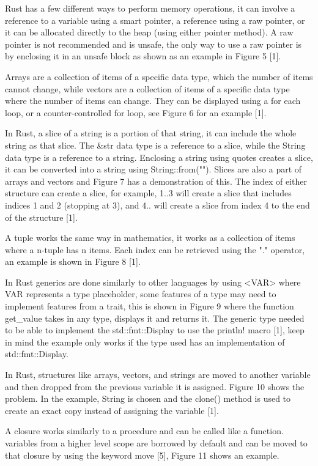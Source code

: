 \documentclass[sigconf,authorversion,nonacm]{acmart}
\begin{document}
Rust has a few different ways to perform memory operations, it can involve a reference to a variable using a smart pointer, a reference using a raw pointer, or it can be allocated directly to the heap (using either pointer method). A raw pointer is not recommended and is unsafe, the only way to use a raw pointer is by enclosing it in an unsafe block as shown as an example in Figure 5 [1].

Arrays are a collection of items of a specific data type, which the number of items cannot change, while vectors are a collection of items of a specific data type where the number of items can change. They can be displayed using a for each loop, or a counter-controlled for loop, see Figure 6 for an example [1].

In Rust, a slice of a string is a portion of that string, it can include the whole string as that slice. The \&str data type is a reference to a slice, while the String data type is a reference to a string. Enclosing a string using quotes creates a slice, it can be converted into a string using String::from(""). Slices are also a part of arrays and vectors and Figure 7 has a demonstration of this. The index of either structure can create a slice, for example, 1..3 will create a slice that includes indices 1 and 2 (stopping at 3), and 4.. will create a slice from index 4 to the end of the structure [1].

A tuple works the same way in mathematics, it works as a collection of items where a n-tuple has n items. Each index can be retrieved using the "." operator, an example is shown in Figure 8 [1].

In Rust generics are done similarly to other languages by using <VAR> where VAR represents a type placeholder, some features of a type may need to implement features from a trait, this is shown in Figure 9 where the function get\_value takes in any type, displays it and returns it. The generic type needed to be able to implement the std::fmt::Display to use the println! macro [1], keep in mind the example only works if the type used has an implementation of std::fmt::Display.

In Rust, structures like arrays, vectors, and strings are moved to another variable and then dropped from the previous variable it is assigned. Figure 10 shows the problem. In the example, String is chosen and the clone() method is used to create an exact copy instead of assigning the variable [1].

A closure works similarly to a procedure and can be called like a function. variables from a higher level scope are borrowed by default and can be moved to that closure by using the keyword move [5], Figure 11 shows an example.
\end{document}
